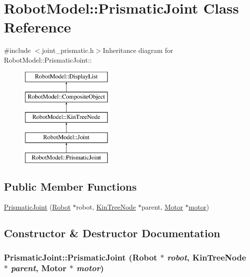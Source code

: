 \hypertarget{class_robot_model_1_1_prismatic_joint}{
\section{RobotModel::PrismaticJoint Class Reference}
\label{class_robot_model_1_1_prismatic_joint}
}


{\ttfamily \#include $<$joint\_\-prismatic.h$>$}Inheritance diagram for RobotModel::PrismaticJoint::\begin{figure}[H]
\begin{center}
\leavevmode
\includegraphics[height=5cm]{class_robot_model_1_1_prismatic_joint}
\end{center}
\end{figure}
\subsection*{Public Member Functions}
\begin{DoxyCompactItemize}
\item 
\hyperlink{class_robot_model_1_1_prismatic_joint_a0a842b2415dafda9a87c854925fdc0b7}{PrismaticJoint} (\hyperlink{class_robot_model_1_1_robot}{Robot} $\ast$robot, \hyperlink{class_robot_model_1_1_kin_tree_node}{KinTreeNode} $\ast$parent, \hyperlink{class_robot_model_1_1_motor}{Motor} $\ast$\hyperlink{class_robot_model_1_1_joint_a9fe40b0c9b6562d7a4cce3dd8715f945}{motor})
\end{DoxyCompactItemize}


\subsection{Constructor \& Destructor Documentation}
\hypertarget{class_robot_model_1_1_prismatic_joint_a0a842b2415dafda9a87c854925fdc0b7}{
\subsubsection[{PrismaticJoint}]{\setlength{\rightskip}{0pt plus 5cm}PrismaticJoint::PrismaticJoint ({\bf Robot} $\ast$ {\em robot}, \/  {\bf KinTreeNode} $\ast$ {\em parent}, \/  {\bf Motor} $\ast$ {\em motor})}}
\label{class_robot_model_1_1_prismatic_joint_a0a842b2415dafda9a87c854925fdc0b7}


